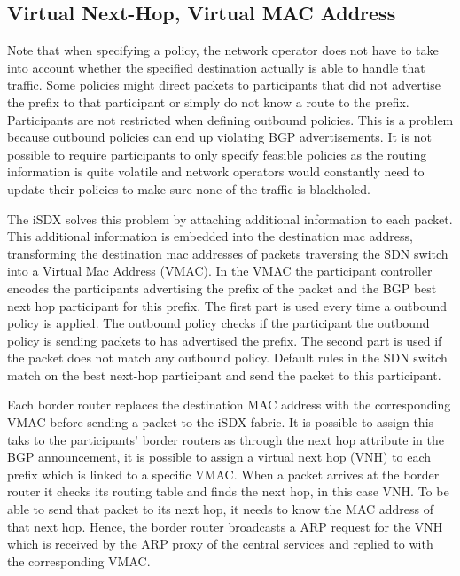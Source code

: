 \subsection{\label{chapter2:iSDX:VNH_VMAC}Virtual Next-Hop, Virtual MAC Address}


Note that when specifying a policy, the network operator does not have to take into account whether the specified destination actually is able to handle that traffic. Some policies might direct packets to participants that did not advertise the prefix to that participant or simply do not know a route to the prefix. Participants are not restricted when defining outbound policies. This is a problem because outbound policies can end up violating BGP advertisements. It is not possible to require participants to only specify feasible policies as the routing information is quite volatile and network operators would constantly need to update their policies to make sure none of the traffic is blackholed. 

The iSDX solves this problem by attaching additional information to each packet. This additional information is embedded into the destination mac address, transforming the destination mac addresses of packets traversing the SDN switch into a Virtual Mac Address (VMAC).
In the VMAC the participant controller encodes the participants advertising the prefix of the packet and the BGP best next hop participant for this prefix. The first part is used every time a outbound policy is applied. The outbound policy checks if the participant the outbound policy is sending packets to has advertised the prefix. The second part is used if the packet does not match any outbound policy. Default rules in the SDN switch match on the best next-hop participant and send the packet to this participant.

Each border router replaces the destination MAC address with the corresponding VMAC before sending a packet to the iSDX fabric. It is possible to assign this taks to the participants' border routers as through the next hop attribute in the BGP announcement, it is possible to assign a virtual next hop (VNH) to each prefix which is linked to a specific VMAC. When a packet arrives at the border router it checks its routing table and finds the next hop, in this case VNH. To be able to send that packet to its next hop, it needs to know the MAC address of that next hop. Hence, the border router broadcasts a ARP request for the VNH which is received by the ARP proxy of the central services and replied to with the corresponding VMAC.

